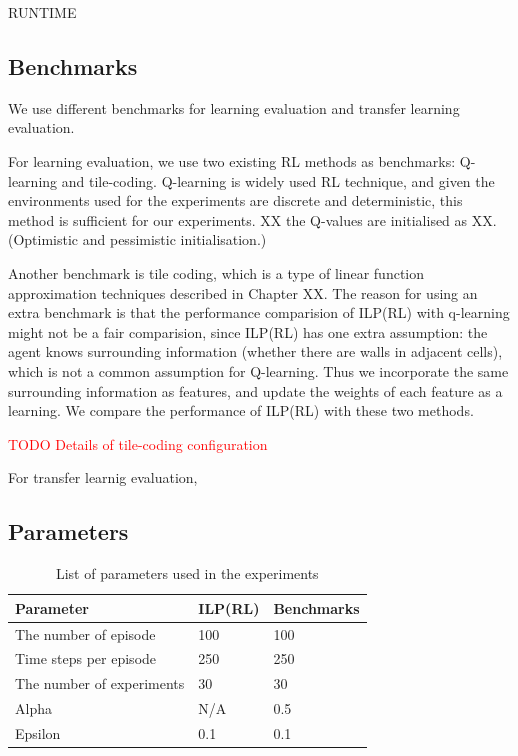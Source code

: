 RUNTIME

\subsection{Benchmarks}
\label{subsec:benchmarks}
We use different benchmarks for learning evaluation and transfer learning evaluation. 

For learning evaluation, we use two existing RL methods as benchmarks: Q-learning and tile-coding.
Q-learning is widely used RL technique, and given the environments used for the experiments are discrete and deterministic, this method is sufficient for our experiments.
XX the Q-values are initialised as XX. (Optimistic and pessimistic initialisation.)

Another benchmark is tile coding, which is a type of linear function approximation techniques described in Chapter XX.
The reason for using an extra benchmark is that the performance comparision of ILP(RL) with q-learning might not be a fair comparision,
since ILP(RL) has one extra assumption: the agent knows surrounding information (whether there are walls in adjacent cells),
which is not a common assumption for Q-learning. Thus we incorporate the same surrounding information as features, and update the weights of each feature as a learning.
We compare the performance of ILP(RL) with these two methods.

\textcolor{red}{TODO Details of tile-coding configuration}

For transfer learnig evaluation, 

\subsection{Parameters}
\begin{table}[!ht!b]
\centering
\begin{tabular}{lll}
\hline
Parameter            & ILP(RL)    & Benchmarks      \\ \hline
The number of episode& 100        & 100        \\
Time steps per episode& 250        & 250        \\
The number of experiments& 30       & 30       \\
Alpha                & N/A       & 0.5       \\
Epsilon              & 0.1        & 0.1        \\
\end{tabular}
\caption{List of parameters used in the experiments}
\label{param}
\end{table}

